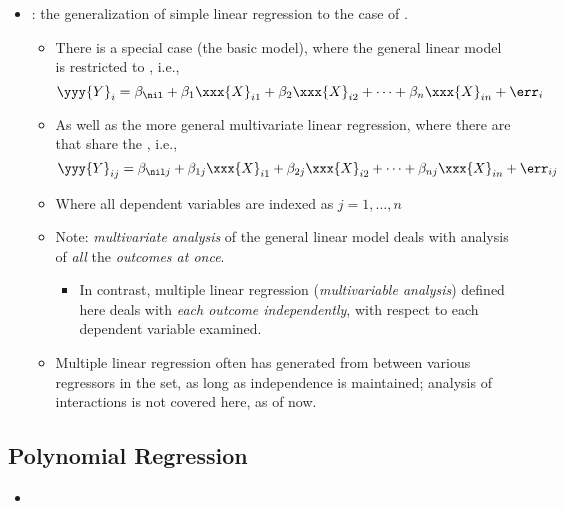 \begin{itemize}
\begin{itemize}
    \item {}: the generalization of simple linear regression to the case of .
      \begin{itemize}
        \item There is a special case (the basic model), where the general linear model is restricted to , i.e.,
        \[%
        \yyy{Y}_i = \beta_\nil + \beta_1 \xxx{X}_{i1} + \beta_2 \xxx{X}_{i2} + \cdots + \beta_n \xxx{X}_{in} + \err_{i}
        \]%
        \item As well as the more general multivariate linear regression, where there are  that share the , i.e.,
        \[%
        \yyy{Y}_{ij} = \beta_{\nil j} + \beta_{1j} \xxx{X}_{i1} + \beta_{2j} \xxx{X}_{i2} + \cdots + \beta_{nj} \xxx{X}_{in} + \err_{ij}
        \]%
        \item Where all dependent variables are indexed as \(j = 1, \ldots, n\)
        \item Note: \emph{multivariate analysis} of the general linear model deals with analysis of \emph{all} the \emph{outcomes at once}.
          \begin{itemize}
            \item In contrast, multiple linear regression (\emph{multivariable analysis}) defined here deals with \emph{each outcome independently}, with respect to each dependent variable examined.
          \end{itemize}
        \item Multiple linear regression often has  generated from  between various regressors in the set, as long as independence is maintained; analysis of interactions is not covered here, as of now.
      \end{itemize}
  \end{itemize}
  
  
  \subsection{Polynomial Regression}
  \begin{itemize}
    \item 
  \end{itemize}
  

\end{itemize}
